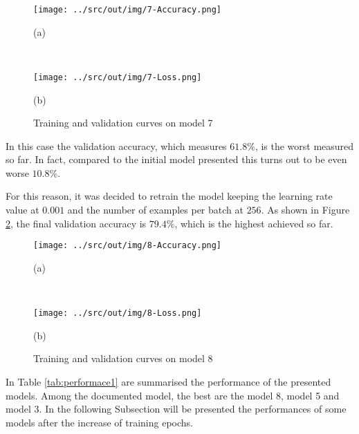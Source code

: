 \documentclass[a4paper,12pt]{article} %
\begin{document}
	\begin{figure}[H]
		\begin{minipage}[c]{.49\textwidth}
			\centering
			\texttt{[image: ../src/out/img/7-Accuracy.png]}
			\caption*{(a)}
		\end{minipage}
		~
		\begin{minipage}[c]{.49\textwidth}
			\centering
			\texttt{[image: ../src/out/img/7-Loss.png]}
			\caption*{(b)}
		\end{minipage}
		\caption{Training and validation curves on model 7}
		\label{fig:model7-performance}
	\end{figure}
	In this case the validation accuracy, which measures $61.8\%$, is the worst 
	measured so far. In fact, compared to the initial model presented this 
	turns out to be even worse $10.8\%$. 
	\newline
	
	For this reason, it was decided to retrain the model keeping the learning 
	rate value at $0.001$ and the number of examples per batch at $256$.
	As shown in Figure \ref{fig:model8-performance}, the final validation 
	accuracy is $79.4\%$, which is the highest achieved so far.
	
	\begin{figure}[htb]
		\begin{minipage}[c]{.49\textwidth}
			\centering
			\texttt{[image: ../src/out/img/8-Accuracy.png]}
			\caption*{(a)}
		\end{minipage}
		~
		\begin{minipage}[c]{.49\textwidth}
			\centering
			\texttt{[image: ../src/out/img/8-Loss.png]}
			\caption*{(b)}
		\end{minipage}
		\caption{Training and validation curves on model 8}
		\label{fig:model8-performance}
	\end{figure}

	In Table \ref{tab:performace1} are summarised the performance of the 
	presented models. Among the documented model, the best are the model 8, 
	model 5 and model 3. 
	In the following Subsection will be presented the performances of some 
	models after the increase of training epochs.
	
\end{document}
